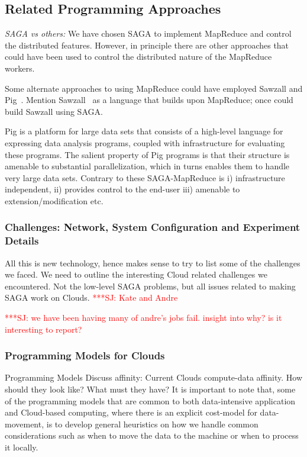 \documentclass[conference,final]{IEEEtran}
\newcommand{\jhanote}[1]{ {\textcolor{red} { ***SJ: #1 }}}
\newcommand{\jhanote}[1]{}
\newcommand{\sagamapreduce }{SAGA-MapReduce }
\begin{document}
\subsection*{Related Programming Approaches}

{\it SAGA vs others:} We have chosen SAGA to implement MapReduce and
control the distributed features. However, in principle there are
other approaches that could have been used to control the distributed
nature of the MapReduce workers.

Some alternate approaches to using MapReduce could have employed
Sawzall and Pig~\cite{pig}.  Mention Sawzall~\cite{sawzall} as a
language that builds upon MapReduce; once could build Sawzall using
SAGA.

Pig is a platform for large data sets that consists of a high-level
language for expressing data analysis programs, coupled with
infrastructure for evaluating these programs. The salient property of
Pig programs is that their structure is amenable to substantial
parallelization, which in turns enables them to handle very large data
sets. Contrary to these \sagamapreduce is i) infrastructure independent, 
ii) provides control to the end-user iii) amenable to extension/modification etc.



\subsubsection*{Challenges: Network, System Configuration and
  Experiment Details}

All this is new technology, hence makes sense to try to list some of
the challenges we faced. We need to outline the interesting Cloud
related challenges we encountered.  Not the low-level SAGA problems,
but all issues related to making SAGA work on Clouds.
\jhanote{Kate and Andre}

\jhanote{we have been having many of andre's jobs fail. insight into
  why? is it interesting to report?}

\subsubsection*{Programming Models for Clouds}

Programming Models Discuss affinity: Current Clouds compute-data
affinity. How should they look like? What must they have?
It is important to
note that, some of the programming models that are common to both
data-intensive application and Cloud-based computing, where there is
an explicit cost-model for data-movement, is to develop general
heuristics on how we handle common considerations such as when to move
the data to the machine or when to process it locally.
\end{document}
